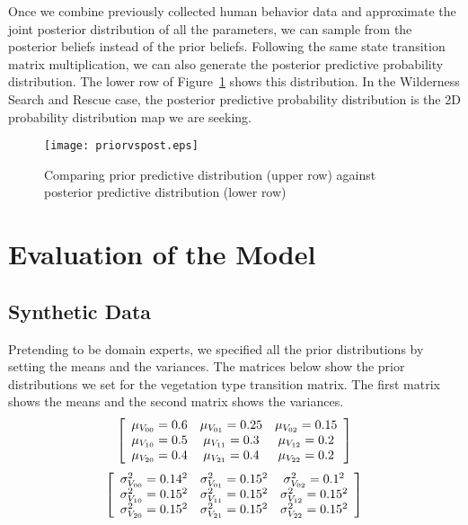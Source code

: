 \documentclass[smallextended,natbib]{svjour3}
\begin{document}
Once we combine previously collected human behavior data and approximate the joint posterior distribution of all the parameters, we can sample from the posterior beliefs instead of the prior beliefs. Following the same state transition matrix multiplication, we can also generate the posterior predictive probability distribution. The lower row of Figure~\ref{priorvspost} shows this distribution. In the Wilderness Search and Rescue case, the posterior predictive probability distribution is the 2D probability distribution map we are seeking.

\begin{figure}
\centering
\texttt{[image: priorvspost.eps]}
\caption[Comparing prior predictive distribution against posterior predictive distribution]{Comparing prior predictive distribution (upper row) against posterior predictive distribution (lower row)}
\label{priorvspost}
\end{figure}

\section{Evaluation of the Model}
\label{sec:4}

\subsection{Synthetic Data}
\label{sec:4.1}

Pretending to be domain experts, we specified all the prior distributions by setting the means and the variances. The matrices below show the prior distributions we set for the vegetation type transition matrix. The first matrix shows the means and the second matrix shows the variances.
\begin{equation}
\centering
\left[
\begin{array}{ccc}
\mu_{V_{00}}=0.6 & \mu_{V_{01}}=0.25 & \mu_{V_{02}}=0.15 \nonumber \\
\mu_{V_{10}}=0.5 & \mu_{V_{11}}=0.3 & \mu_{V_{12}}=0.2 \nonumber \\
\mu_{V_{20}}=0.4 & \mu_{V_{21}}=0.4 & \mu_{V_{22}}=0.2 \nonumber \\
\end{array}
\right]
\end{equation}
\begin{equation}
\centering
\left[
\begin{array}{ccc}
\sigma^2_{V_{00}}=0.14^2 & \sigma^2_{V_{01}}=0.15^2 & \sigma^2_{V_{02}}=0.1^2 \nonumber \\
\sigma^2_{V_{10}}=0.15^2 & \sigma^2_{V_{11}}=0.15^2 & \sigma^2_{V_{12}}=0.15^2 \nonumber \\
\sigma^2_{V_{20}}=0.15^2 & \sigma^2_{V_{21}}=0.15^2 & \sigma^2_{V_{22}}=0.15^2 \nonumber \\
\end{array}
\right]
\end{equation}
\end{document}
